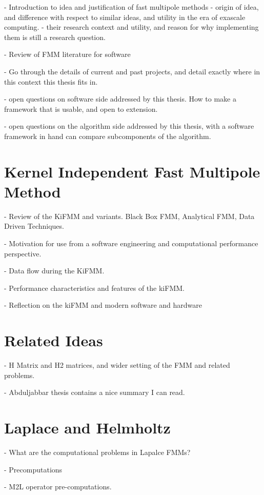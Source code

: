 - Introduction to idea and justification of fast multipole methods
- origin of idea, and difference with respect to similar ideas, and utility in the era of exascale computing.
- their research context and utility, and reason for why implementing them is still a research question.

- Review of FMM literature for software

- Go through the details of current and past projects, and detail exactly where in this context this thesis fits in.

- open questions on software side addressed by this thesis. How to make a framework that is usable, and open to extension.

- open questions on the algorithm side addressed by this thesis, with a software framework in hand can compare subcomponents of the algorithm.

\section{Kernel Independent Fast Multipole Method}

- Review of the KiFMM and variants. Black Box FMM, Analytical FMM, Data Driven Techniques.

- Motivation for use from a software engineering and computational performance perspective.

- Data flow during the KiFMM.

- Performance characteristics and features of the kiFMM.

- Reflection on the kiFMM and modern software and hardware


\section{Related Ideas}

- H Matrix and H2 matrices, and wider setting of the FMM and related problems.

- Abduljabbar thesis contains a nice summary I can read.




\section{Laplace and Helmholtz}

- What are the computational problems in Lapalce FMMs?

- Precomputations

- M2L operator pre-computations.

